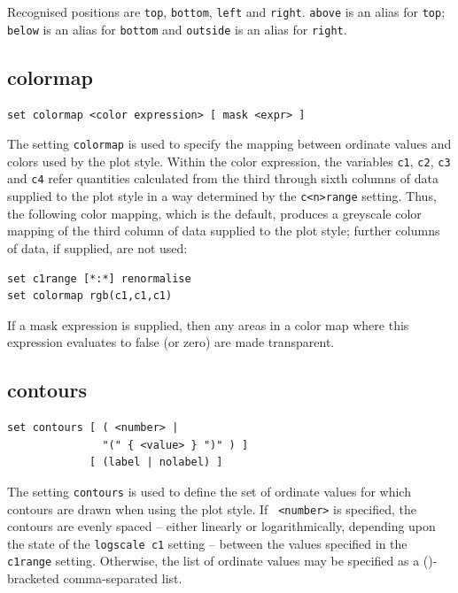 Recognised positions are {\tt top}, {\tt bottom}, {\tt left} and {\tt right}.
{\tt above} is an alias for {\tt top}; {\tt below} is an alias for {\tt bottom}
and {\tt outside} is an alias for {\tt right}.


\subsection{colormap}

\begin{verbatim}
set colormap <color expression> [ mask <expr> ]
\end{verbatim}

The setting {\tt colormap} is used to specify the mapping between ordinate
values and colors used by the  plot style.  Within the color
expression, the variables {\tt c1}, {\tt c2}, {\tt c3} and {\tt c4} refer
quantities calculated from the third through sixth columns of data supplied to
the  plot style in a way determined by the {\tt c<n>range}
setting.  Thus, the following color mapping, which is the default, produces a
greyscale color mapping of the third column of data supplied to the
 plot style; further columns of data, if supplied, are not
used:

\begin{verbatim}
set c1range [*:*] renormalise
set colormap rgb(c1,c1,c1)
\end{verbatim}

If a mask expression is supplied, then any areas in a color map where this
expression evaluates to false (or zero) are made transparent.


\subsection{contours}

\begin{verbatim}
set contours [ ( <number> |
               "(" { <value> } ")" ) ]
             [ (label | nolabel) ]
\end{verbatim}

The setting {\tt contours} is used to define the set of ordinate values for
which contours are drawn when using the  plot style. If {\tt
<number>} is specified, the contours are evenly spaced -- either linearly or
logarithmically, depending upon the state of the {\tt logscale c1} setting --
between the values specified in the {\tt c1range} setting. Otherwise, the list
of ordinate values may be specified as a ()-bracketed comma-separated list.

